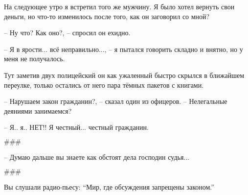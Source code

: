 На следующее утро я встретил того же мужчину. Я было хотел вернуть свои деньги, но что-то изменилось после того, как он заговорил со мной?

-- Ну что? Как оно?, -- спросил он ехидно.

-- Я в ярости... всё неправильно..., -- я пытался говорить складно и внятно, но у меня не получалось.

Тут заметив двух полицейский он как ужаленный быстро скрылся в ближайшем переулке, только остались от него пара тёмных пакетов с книгами.

-- Нарушаем закон гражданин?, -- сказал один из офицеров. -- Нелегальные деяниями занимаемся?

-- Я.. я.. НЕТ!! Я честный... честный гражданин.

\begin{center}\( \#\#\# \)\end{center}

-- Думаю дальше вы знаете как обстоят дела господин судья...

\begin{center}\( \#\#\# \)\end{center}

Вы слушали радио-пьесу: ``Мир, где обсуждения запрещены законом.''